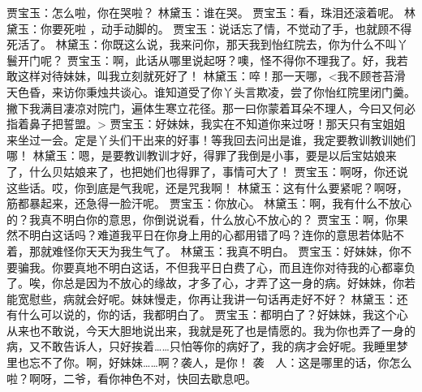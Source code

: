 \documentclass{article}
\begin{document}
贾宝玉：怎么啦，你在哭啦？
林黛玉：谁在哭。
贾宝玉：看，珠泪还滚着呢。
林黛玉：你要死啦 ，动手动脚的。
贾宝玉：说话忘了情，不觉动了手，也就顾不得死活了。
林黛玉：你既这么说，我来问你，那天我到怡红院去，你为什么不叫丫鬟开门呢？
贾宝玉：啊，此话从哪里说起呀？噢，怪不得你不理我了。好，我若敢这样对待妹妹，叫我立刻就死好了！
林黛玉：啐！那一天哪，<我不顾苍苔滑天色昏，来访你秉烛共谈心。谁知道受了你丫头言欺凌，尝了你怡红院里闭门羹。撇下我满目凄凉对院门，遍体生寒立花径。那一曰你蒙着耳朵不理人，今曰又何必指着鼻子把誓盟。>
贾宝玉：好妹妹，我实在不知道你来过呀！那天只有宝姐姐来坐过一会。定是丫头们干出来的好事！等我回去问出是谁，我定要教训教训她们哪！
林黛玉：嗯，是要教训教训才好，得罪了我倒是小事，要是以后宝姑娘来了，什么贝姑娘来了，也把她们也得罪了，事情可大了！
贾宝玉：啊呀，你还说这些话。哎，你到底是气我呢，还是咒我啊！
林黛玉：这有什么要紧呢？啊呀，筋都暴起来，还急得一脸汗呢。
贾宝玉：你放心。
林黛玉：啊，我有什么不放心的？我真不明白你的意思，你倒说说看，什么放心不放心的？
贾宝玉：啊，你果然不明白这话吗？难道我平日在你身上用的心都用错了吗？连你的意思若体贴不着，那就难怪你天天为我生气了。
林黛玉：我真不明白。
贾宝玉：好妹妹，你不要骗我。你要真地不明白这话，不但我平日白费了心，而且连你对待我的心都辜负了。唉，你总是因为不放心的缘故，才多了心，才弄了这一身的病。好妹妹，你若能宽慰些，病就会好呢。妹妹慢走，你再让我讲一句话再走好不好？
林黛玉：还有什么可以说的，你的话，我都明白了。
贾宝玉：都明白了？好妹妹，我这个心从来也不敢说，今天大胆地说出来，我就是死了也是情愿的。我为你也弄了一身的病，又不敢告诉人，只好挨着……只怕等你的病好了，我的病才会好呢。我睡里梦里也忘不了你。啊，好妹妹……啊？袭人，是你！
袭　人：这是哪里的话，你怎么啦？啊呀，二爷，看你神色不对，快回去歇息吧。
\end{document}
